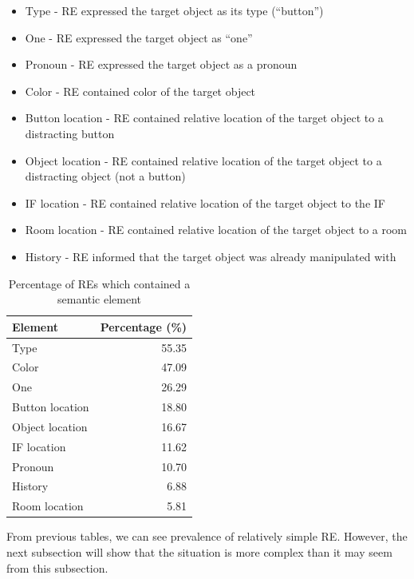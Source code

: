 \begin{itemize}
\item
Type - RE expressed the target object as its type (``button'')
\item
One - RE expressed the target object as ``one''
\item
Pronoun - RE expressed the target object as a pronoun
\item
Color -  RE contained color of the target object
\item
Button location - RE contained relative location of the target object to a distracting button
\item
Object location - RE contained relative location of the target object to a distracting object (not a button)
\item 
IF location - RE contained relative location of the target object to the IF
\item
Room location - RE contained relative location of the target object to a room
\item
History - RE informed that the target object was already manipulated with
\end{itemize}

\begin{table}[!htbp]
 \centering
\begin{tabular}{lr}
\toprule
Element  & Percentage (\%)  \\
\midrule
Type   			& 55.35\\
Color			& 47.09\\
One 				& 26.29\\
Button location & 18.80\\
Object location 	& 16.67\\
IF location		& 11.62\\
Pronoun			& 10.70\\
History			& 6.88\\
Room location 	& 5.81\\
\bottomrule
\end{tabular}
\caption{Percentage of REs which contained a semantic element}
\label{tab:res-contents}
\end{table} 

From previous tables, we can see prevalence of relatively simple RE. However, the next subsection will show that the situation is more complex than it may seem from this subsection.

